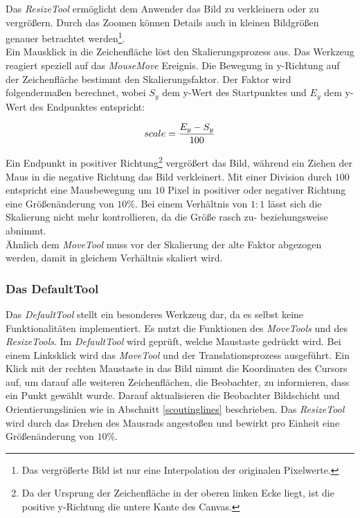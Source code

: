 Das \textit{ResizeTool} ermöglicht dem Anwender das Bild zu verkleinern oder zu vergrößern. Durch das Zoomen können Details auch in kleinen Bildgrößen genauer betrachtet werden\footnote{Das vergrößerte Bild ist nur eine Interpolation der originalen Pixelwerte.}.\\
Ein Mausklick in die Zeichenfläche löst den Skalierungsprozess aus. Das Werkzeug reagiert speziell auf das \textit{MouseMove} Ereignis. Die Bewegung in y-Richtung auf der Zeichenfläche bestimmt den Skalierungsfaktor. Der Faktor wird folgendermaßen berechnet, wobei $S_y$ dem y-Wert des Startpunktes  und $E_y$ dem y-Wert des Endpunktes entspricht: 

\begin{equation}
scale = \frac{E_y - S_y}{100}
\vspace{0.5cm}
\end{equation}

Ein Endpunkt in positiver Richtung\footnote{Da der Ursprung der Zeichenfläche in der oberen linken Ecke liegt, ist die positive y-Richtung die untere Kante des Canvas.} vergrößert das Bild, während ein Ziehen der Maus in die negative Richtung das Bild verkleinert. Mit einer Division durch $100$ entspricht eine Mausbewegung um $10$ Pixel in positiver oder negativer Richtung eine Größenänderung von $10\%$. Bei einem Verhältnis von $1:1$ lässt sich die Skalierung nicht mehr kontrollieren, da die Größe rasch zu- beziehungsweise abnimmt.\\
Ähnlich dem \textit{MoveTool} muss vor der Skalierung der alte Faktor abgezogen werden, damit in gleichem Verhältnis skaliert wird.

\subsubsection{Das DefaultTool}

Das \textit{DefaultTool} stellt ein besonderes Werkzeug dar, da es selbst keine Funktionalitäten implementiert. Es nutzt die Funktionen des \textit{MoveTools} und des \textit{ResizeTools}. Im \textit{DefaultTool} wird geprüft, welche Maustaste gedrückt wird. Bei einem Linksklick wird das \textit{Move\-Tool} und der Translationsprozess ausgeführt. Ein Klick mit der rechten Maustaste in das Bild nimmt die Koordinaten des Cursors auf, um darauf alle weiteren Zeichenflächen, die Beobachter, zu informieren, dass ein Punkt gewählt wurde. Darauf aktualisieren die Beobachter Bildschicht und Orientierungslinien wie in Abschnitt \ref{scoutinglines} beschrieben. Das \textit{ResizeTool} wird durch das Drehen des Mausrads angestoßen und bewirkt pro Einheit eine Größenänderung von $10\%$.

